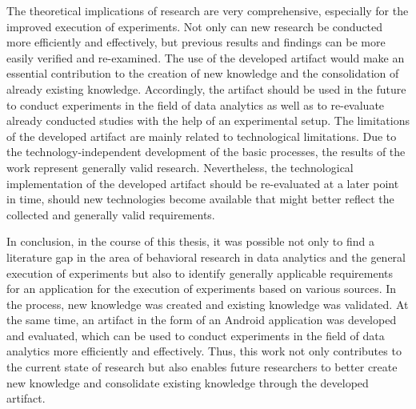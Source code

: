 The theoretical implications of research are very comprehensive, especially for the improved execution of experiments. Not only can new research be conducted more efficiently and effectively, but previous results and findings can be more easily verified and re-examined. The use of the developed artifact would make an essential contribution to the creation of new knowledge and the consolidation of already existing knowledge. Accordingly, the artifact should be used in the future to conduct experiments in the field of data analytics as well as to re-evaluate already conducted studies with the help of an experimental setup. The limitations of the developed artifact are mainly related to technological limitations. Due to the technology-independent development of the basic processes, the results of the work represent generally valid research. Nevertheless, the technological implementation of the developed artifact should be re-evaluated at a later point in time, should new technologies become available that might better reflect the collected and generally valid requirements.

In conclusion, in the course of this thesis, it was possible not only to find a literature gap in the area of behavioral research in data analytics and the general execution of experiments but also to identify generally applicable requirements for an application for the execution of experiments based on various sources. In the process, new knowledge was created and existing knowledge was validated. At the same time, an artifact in the form of an Android application was developed and evaluated, which can be used to conduct experiments in the field of data analytics more efficiently and effectively. Thus, this work not only contributes to the current state of research but also enables future researchers to better create new knowledge and consolidate existing knowledge through the developed artifact.
